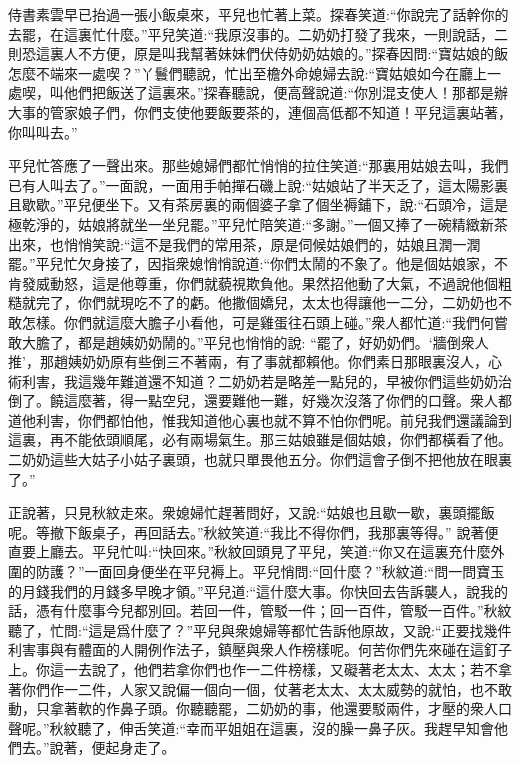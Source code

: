 \begin{parag}
    侍書素雲早已抬過一張小飯桌來，平兒也忙著上菜。探春笑道:“你說完了話幹你的去罷，在這裏忙什麼。”平兒笑道:“我原沒事的。二奶奶打發了我來，一則說話，二則恐這裏人不方便，原是叫我幫著妹妹們伏侍奶奶姑娘的。”探春因問:“寶姑娘的飯怎麼不端來一處喫？”丫鬟們聽說，忙出至檐外命媳婦去說:“寶姑娘如今在廳上一處喫，叫他們把飯送了這裏來。”探春聽說，便高聲說道:“你別混支使人！那都是辦大事的管家娘子們，你們支使他要飯要茶的，連個高低都不知道！平兒這裏站著，你叫叫去。”
\end{parag}


\begin{parag}
    平兒忙答應了一聲出來。那些媳婦們都忙悄悄的拉住笑道:“那裏用姑娘去叫，我們已有人叫去了。”一面說，一面用手帕撣石磯上說:“姑娘站了半天乏了，這太陽影裏且歇歇。”平兒便坐下。又有茶房裏的兩個婆子拿了個坐褥鋪下，說:“石頭冷，這是極乾淨的，姑娘將就坐一坐兒罷。”平兒忙陪笑道:“多謝。”一個又捧了一碗精緻新茶出來，也悄悄笑說:“這不是我們的常用茶，原是伺候姑娘們的，姑娘且潤一潤罷。”平兒忙欠身接了，因指衆媳悄悄說道:“你們太鬧的不象了。他是個姑娘家，不肯發威動怒，這是他尊重，你們就藐視欺負他。果然招他動了大氣，不過說他個粗糙就完了，你們就現吃不了的虧。他撒個嬌兒，太太也得讓他一二分，二奶奶也不敢怎樣。你們就這麼大膽子小看他，可是雞蛋往石頭上碰。”衆人都忙道:“我們何嘗敢大膽了，都是趙姨奶奶鬧的。”平兒也悄悄的說: “罷了，好奶奶們。‘牆倒衆人推’，那趙姨奶奶原有些倒三不著兩，有了事就都賴他。你們素日那眼裏沒人，心術利害，我這幾年難道還不知道？二奶奶若是略差一點兒的，早被你們這些奶奶治倒了。饒這麼著，得一點空兒，還要難他一難，好幾次沒落了你們的口聲。衆人都道他利害，你們都怕他，惟我知道他心裏也就不算不怕你們呢。前兒我們還議論到這裏，再不能依頭順尾，必有兩場氣生。那三姑娘雖是個姑娘，你們都橫看了他。二奶奶這些大姑子小姑子裏頭，也就只單畏他五分。你們這會子倒不把他放在眼裏了。”
\end{parag}


\begin{parag}
    正說著，只見秋紋走來。衆媳婦忙趕著問好，又說:“姑娘也且歇一歇，裏頭擺飯呢。等撤下飯桌子，再回話去。”秋紋笑道:“我比不得你們，我那裏等得。” 說著便直要上廳去。平兒忙叫:“快回來。”秋紋回頭見了平兒，笑道:“你又在這裏充什麼外圍的防護？”一面回身便坐在平兒褥上。平兒悄問:“回什麼？”秋紋道:“問一問寶玉的月錢我們的月錢多早晚才領。”平兒道:“這什麼大事。你快回去告訴襲人，說我的話，憑有什麼事今兒都別回。若回一件，管駁一件；回一百件，管駁一百件。”秋紋聽了，忙問:“這是爲什麼了？”平兒與衆媳婦等都忙告訴他原故，又說:“正要找幾件利害事與有體面的人開例作法子，鎮壓與衆人作榜樣呢。何苦你們先來碰在這釘子上。你這一去說了，他們若拿你們也作一二件榜樣，又礙著老太太、太太；若不拿著你們作一二件，人家又說偏一個向一個，仗著老太太、太太威勢的就怕，也不敢動，只拿著軟的作鼻子頭。你聽聽罷，二奶奶的事，他還要駁兩件，才壓的衆人口聲呢。”秋紋聽了，伸舌笑道:“幸而平姐姐在這裏，沒的臊一鼻子灰。我趕早知會他們去。”說著，便起身走了。
\end{parag}


